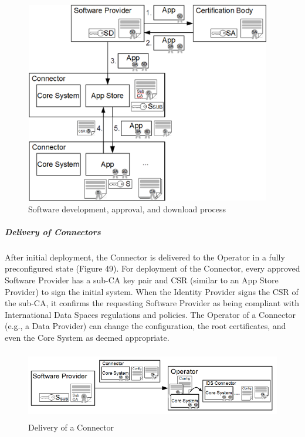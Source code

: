 \begin{figure}[H]
	\begin{Center}
		\includegraphics[width=4.24in,height=3.48in]{./media/image64.png}
		\caption{Software development, approval, and download process}
		\label{fig:Software_development_approval_and_download_process}
	\end{Center}
\end{figure}



\subparagraph*{Delivery of Connectors \\}
After initial deployment, the Connector is delivered to the Operator in a fully preconfigured state (Figure 49). For deployment of the Connector, every approved Software Provider has a sub-CA key pair and CSR (similar to an App Store Provider) to sign the initial system. When the Identity Provider signs the CSR of the sub-CA, it confirms the requesting Software Provider as being compliant with International Data Spaces regulations and policies. The Operator of a Connector (e.g., a Data Provider) can change the configuration, the root certificates, and even the Core System as deemed appropriate.




\begin{figure}[H]
	\begin{Center}
		\includegraphics[width=5.17in,height=1.2in]{./media/image65.png}
		\caption{ Delivery of a Connector}
		\label{fig:_Delivery_of_a_Connector}
	\end{Center}
\end{figure}


